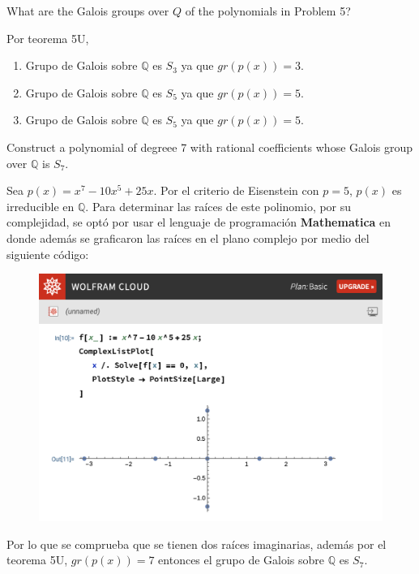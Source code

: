 \begin{problema}[Problema 5]
\end{problema}


\begin{problema}[Problema 6]
    What are the Galois groups over $Q$ of the polynomials in Problem 5?
    \begin{dem}
        Por teorema 5U,
        \begin{enumerate}
            \item Grupo de Galois sobre $\mathbb{Q}$ es $S_3$ ya que $gr(p(x))=3$.
            \item Grupo de Galois sobre $\mathbb{Q}$ es $S_5$ ya que $gr(p(x))=5$.
            \item Grupo de Galois sobre $\mathbb{Q}$ es $S_5$ ya que $gr(p(x))=5$.
        \end{enumerate}
    \end{dem}
\end{problema}

\begin{problema}[Problema 7]
    Construct a polynomial of degreee 7 with rational coefficients whose Galois group over $\mathbb{Q}$ is $S_7$. 
    \begin{sol}
        Sea $p(x)=x^7-10x^5+25x$. Por el criterio de Eisenstein con $p=5$, $p(x)$ es irreducible en $\mathbb{Q}$. Para determinar las raíces de este polinomio, por su complejidad, se optó por usar el lenguaje de programación \textbf{Mathematica} en donde además se graficaron las raíces en el plano complejo por medio del siguiente código: 
        \begin{figure}[H]
            \centering
            \includegraphics[scale=0.6]{Problemas/image1.png}
        \end{figure}
        Por lo que se comprueba que se tienen dos raíces imaginarias, además por el teorema 5U, $gr(p(x))=7$ entonces el grupo de Galois sobre $\mathbb{Q}$ es $S_7$.
    \end{sol}
\end{problema}



%
%

